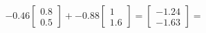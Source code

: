 \documentclass[preview]{standalone}
\begin{document}
\begin{align*}
-0.46 \begin{bmatrix} 0.8 \\ 0.5 \end{bmatrix} + -0.88 \begin{bmatrix} 1 \\ 1.6 \end{bmatrix} = \begin{bmatrix} -1.24 \\ -1.63 \end{bmatrix} =
\end{align*}
\end{document}
